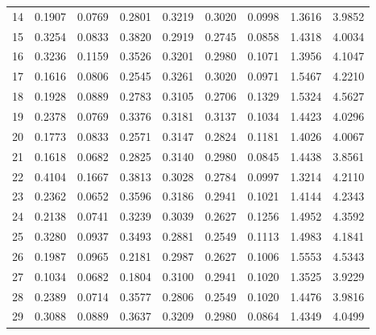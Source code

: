 \begin{anexosenv}
\begin{table}[htbp!]
\begin{tabular}{|l|l|l|l|l|l|l|l|l|}
14   & 0.1907   & 0.0769   & 0.2801               & 0.3219   & 0.3020   & 0.0998               & 1.3616  & 3.9852               \\
15   & 0.3254   & 0.0833   & 0.3820               & 0.2919   & 0.2745   & 0.0858               & 1.4318  & 4.0034               \\
16   & 0.3236   & 0.1159   & 0.3526               & 0.3201   & 0.2980   & 0.1071               & 1.3956  & 4.1047               \\
17   & 0.1616   & 0.0806   & 0.2545               & 0.3261   & 0.3020   & 0.0971               & 1.5467  & 4.2210               \\
18   & 0.1928   & 0.0889   & 0.2783               & 0.3105   & 0.2706   & 0.1329               & 1.5324  & 4.5627               \\
19   & 0.2378   & 0.0769   & 0.3376               & 0.3181   & 0.3137   & 0.1034               & 1.4423  & 4.0296               \\
20   & 0.1773   & 0.0833   & 0.2571               & 0.3147   & 0.2824   & 0.1181               & 1.4026  & 4.0067               \\
21   & 0.1618   & 0.0682   & 0.2825               & 0.3140   & 0.2980   & 0.0845               & 1.4438  & 3.8561               \\
22   & 0.4104   & 0.1667   & 0.3813               & 0.3028   & 0.2784   & 0.0997               & 1.3214  & 4.2110               \\
23   & 0.2362   & 0.0652   & 0.3596               & 0.3186   & 0.2941   & 0.1021               & 1.4144  & 4.2343               \\
24   & 0.2138   & 0.0741   & 0.3239               & 0.3039   & 0.2627   & 0.1256               & 1.4952  & 4.3592               \\
25   & 0.3280   & 0.0937   & 0.3493               & 0.2881   & 0.2549   & 0.1113               & 1.4983  & 4.1841               \\
26   & 0.1987   & 0.0965   & 0.2181               & 0.2987   & 0.2627   & 0.1006               & 1.5553  & 4.5343               \\
27   & 0.1034   & 0.0682   & 0.1804               & 0.3100   & 0.2941   & 0.1020               & 1.3525  & 3.9229               \\
28   & 0.2389   & 0.0714   & 0.3577               & 0.2806   & 0.2549   & 0.1020               & 1.4476  & 3.9816               \\
29   & 0.3088   & 0.0889   & 0.3637               & 0.3209   & 0.2980   & 0.0864               & 1.4349  & 4.0499               \\

\end{tabular}
\end{table}
\end{anexosenv}

